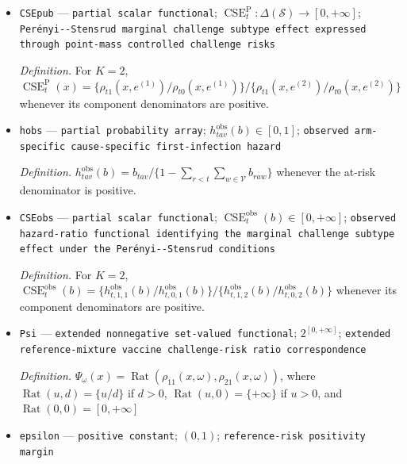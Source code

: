 \documentclass{article}
\begin{document}
\begin{itemize}
  \par\smallskip\noindent\emph{Definition.} \(\rho_{1a}(x,\omega)=\sum_{s\in\mathcal S}\sum_{v\in\mathcal V}\omega_v r_{1av}(s)x_s\) and \(\rho_{2a}(x,\omega)=\sum_{s\in\mathcal S}\sum_{v\in\mathcal V}\omega_v r^{[0]}_{2av}(s)x_s\)
  \item \texttt{CSEpub} --- \texttt{partial scalar functional}; \(\operatorname{CSE}^{\mathrm P}_t:\Delta(\mathcal S)\to[0,+\infty]\); \texttt{Perényi-\allowbreak{}-\allowbreak{}Stensrud marginal challenge subtype effect expressed through point-\allowbreak{}mass controlled challenge risks}
  \par\smallskip\noindent\emph{Definition.} For \(K=2\), \(\operatorname{CSE}^{\mathrm P}_t(x)=\{\rho_{t1}(x,e^{(1)})/\rho_{t0}(x,e^{(1)})\}/\{\rho_{t1}(x,e^{(2)})/\rho_{t0}(x,e^{(2)})\}\) whenever its component denominators are positive.
  \item \texttt{hobs} --- \texttt{partial probability array}; \(h_{tav}^{\mathrm{obs}}(b)\in[0,1]\); \texttt{observed arm-\allowbreak{}specific cause-\allowbreak{}specific first-\allowbreak{}infection hazard}
  \par\smallskip\noindent\emph{Definition.} \(h_{tav}^{\mathrm{obs}}(b)=b_{tav}/\{1-\sum_{r<t}\sum_{w\in\mathcal V}b_{raw}\}\) whenever the at-risk denominator is positive.
  \item \texttt{CSEobs} --- \texttt{partial scalar functional}; \(\operatorname{CSE}^{\mathrm{obs}}_t(b)\in[0,+\infty]\); \texttt{observed hazard-\allowbreak{}ratio functional identifying the marginal challenge subtype effect under the Perényi-\allowbreak{}-\allowbreak{}Stensrud conditions}
  \par\smallskip\noindent\emph{Definition.} For \(K=2\), \(\operatorname{CSE}^{\mathrm{obs}}_t(b)=\{h_{t,1,1}^{\mathrm{obs}}(b)/h_{t,0,1}^{\mathrm{obs}}(b)\}/\{h_{t,1,2}^{\mathrm{obs}}(b)/h_{t,0,2}^{\mathrm{obs}}(b)\}\) whenever its component denominators are positive.
  \item \texttt{Psi} --- \texttt{extended nonnegative set-\allowbreak{}valued functional}; \(2^{[0,+\infty]}\); \texttt{extended reference-\allowbreak{}mixture vaccine challenge-\allowbreak{}risk ratio correspondence}
  \par\smallskip\noindent\emph{Definition.} \(\Psi_\omega(x)=\operatorname{Rat}(\rho_{11}(x,\omega),\rho_{21}(x,\omega))\), where \(\operatorname{Rat}(u,d)=\{u/d\}\) if \(d>0\), \(\operatorname{Rat}(u,0)=\{+\infty\}\) if \(u>0\), and \(\operatorname{Rat}(0,0)=[0,+\infty]\)
  \item \texttt{epsilon} --- \texttt{positive constant}; \((0,1)\); \texttt{reference-\allowbreak{}risk positivity margin}

\end{itemize}
\end{document}
